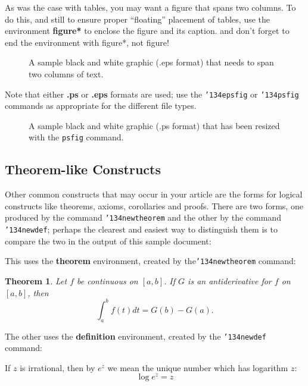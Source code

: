 \documentclass{sig-alternate}
\begin{document}
As was the case with tables, you may want a figure
that spans two columns.  To do this, and still to
ensure proper ``floating'' placement of tables, use the environment
\textbf{figure*} to enclose the figure and its caption.
and don't forget to end the environment with
{figure*}, not {figure}!

\begin{figure*}
\centering
{}
\caption{A sample black and white graphic (.eps format)
that needs to span two columns of text.}
\end{figure*}

Note that either {\textbf{.ps}} or {\textbf{.eps}} formats are
used; use
the \texttt{{\char'134}epsfig} or \texttt{{\char'134}psfig}
commands as appropriate for the different file types.

\begin{figure}
\centering
{}
\caption{A sample black and white graphic (.ps format) that has
been resized with the \texttt{psfig} command.}
\vskip -6pt
\end{figure}

\subsection{Theorem-like Constructs}
Other common constructs that may occur in your article are
the forms for logical constructs like theorems, axioms,
corollaries and proofs.  There are
two forms, one produced by the
command \texttt{{\char'134}newtheorem} and the
other by the command \texttt{{\char'134}newdef}; perhaps
the clearest and easiest way to distinguish them is
to compare the two in the output of this sample document:

This uses the \textbf{theorem} environment, created by
the\linebreak\texttt{{\char'134}newtheorem} command:
\newtheorem{theorem}{Theorem}
\begin{theorem}
Let $f$ be continuous on $[a,b]$.  If $G$ is
an antiderivative for $f$ on $[a,b]$, then
\begin{displaymath}\int^b_af(t)dt = G(b) - G(a).\end{displaymath}
\end{theorem}

The other uses the \textbf{definition} environment, created
by the \texttt{{\char'134}newdef} command:
\begin{definition}
If $z$ is irrational, then by $e^z$ we mean the
unique number which has
logarithm $z$: \begin{displaymath}{\log e^z = z}\end{displaymath}
\end{definition}
\end{document}
